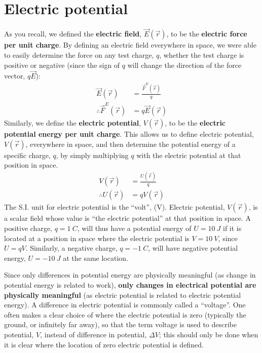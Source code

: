 
\section{Electric potential}
As you recall, we defined the \textbf{electric field}, $\vec E(\vec r)$, to be the \textbf{electric force per unit charge}. By defining an electric field everywhere in space, we were able to easily determine the force on any test charge, $q$, whether the test charge is positive or negative (since the sign of $q$ will change the direction of the force vector, $q\vec E$):
\begin{align*}
\vec E(\vec r) &= \frac{\vec F^E(\vec r)}{q}\\
\therefore \vec F^E(\vec r)&=q\vec E(\vec r)
\end{align*}
Similarly, we define the \textbf{electric potential}, $V(\vec r)$, to be the \textbf{electric potential energy per unit charge}. This allows us to define electric potential, $V(\vec r)$, everywhere in space, and then determine the potential energy of a specific charge, $q$, by simply multiplying $q$ with the electric potential at that position in space.
\begin{align*}
V(\vec r) &= \frac{ U(\vec r)}{q}\\
\therefore U(\vec r)&= q V(\vec r)
\end{align*}
The S.I. unit for electric potential is the ``volt'', (V). Electric potential, $V(\vec r)$, is a scalar field whose value is ``the electric potential'' at that position in space. A positive charge, $q=\SI{1}{C}$, will thus have a potential energy of $U=\SI{10}{J}$ if it is located at a position in space where the electric potential is $V=\SI{10}{V}$, since $U=qV$. Similarly, a negative charge, $q=\SI{-1}{C}$, will have negative potential energy, $U=\SI{-10}{J}$ at the same location.

Since only differences in potential energy are physically meaningful (as change in potential energy is related to work), \textbf{only changes in electrical potential are physically meaningful} (as electric potential is related to electric potential energy). A difference in electric potential is commonly called a ``voltage''. One often makes a clear choice of where the electric potential is zero (typically the ground, or infinitely far away), so that the term voltage is used to describe potential, $V$, instead of difference in potential, $\Delta V$; this should only be done when it is clear where the location of zero electric potential is defined.

